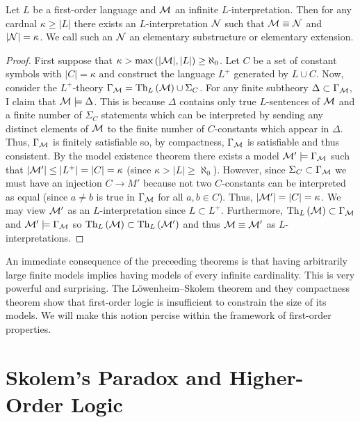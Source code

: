 \documentclass[12pt]{article}
\begin{document}
\begin{theorem}
Let $L$ be a first-order language and $\mathcal{M}$ an infinite $L$-interpretation. Then for any cardnal $\kappa \ge |L|$ there exists an $L$-interpretation $\mathcal{N}$ such that $\mathcal{M} \equiv \mathcal{N}$ and $|\mathcal{N}| = \kappa$. We call such an $\mathcal{N}$ an elementary substructure or elementary extension. 
\end{theorem} 

\begin{proof}
First suppose that $\kappa > \max{(|\mathcal{M}|, |L|)} \ge \aleph_0$. Let $C$ be a set of constant symbols with $|C| = \kappa$ and construct the language $L^+$ generated by $L \cup C$. Now, consider the $L^+$-theory $\Gamma_{\mathcal{M}} = \mathrm{Th}_{L} \left( \mathcal{M} \right) \cup \Sigma_C$. For any finite subtheory $\Delta \subset \Gamma_{\mathcal{M}}$, I claim that $\mathcal{M} \models \Delta$. This is because $\Delta$ contains only true $L$-sentences of $\mathcal{M}$ and a finite number of $\Sigma_C$ statements which can be interpreted by sending any distinct elements of $\mathcal{M}$ to the finite number of $C$-constants which appear in $\Delta$. Thus, $\Gamma_{\mathcal{M}}$ is finitely satisfiable so, by compactness, $\Gamma_{\mathcal{M}}$ is satisfiable and thus consistent. By the model existence theorem there exists a model $\mathcal{M}' \models \Gamma_{\mathcal{M}}$ such that $|\mathcal{M}'| \le |L^+| = |C| = \kappa$ (since $\kappa > |L| \ge \aleph_0$). However, since $\Sigma_C \subset \Gamma_{\mathcal{M}}$ we must have an injection $C \to M'$ because not two $C$-constants can be interpreted as equal (since $a \neq b$ is true in $\Gamma_{\mathcal{M}}$ for all $a,b \in C$). Thus, $|\mathcal{M}'| = |C| = \kappa$. We may view $\mathcal{M}'$ as an $L$-interpretation since $L \subset L^+$. Furthermore, $\mathrm{Th}_{L} \left( \mathcal{M} \right) \subset \Gamma_{\mathcal{M}}$ and $\mathcal{M}' \models \Gamma_{\mathcal{M}}$ so $\mathrm{Th}_{L} \left( \mathcal{M} \right) \subset \mathrm{Th}_{L} \left( \mathcal{M}' \right)$ and thus $\mathcal{M} \equiv \mathcal{M}'$ as $L$-interpretations. 
\end{proof}

\begin{remark}
An immediate consequence of the preceeding theorems is that having arbitrarily large finite models implies having models of every infinite cardinality. This is very powerful and surprising. The L\"{o}wenheim–Skolem theorem and they compactness theorem show that first-order logic is insufficient to constrain the size of its models. We will make this notion percise within the framework of first-order properties.
\end{remark}

\section{Skolem's Paradox and Higher-Order Logic}
\end{document}
